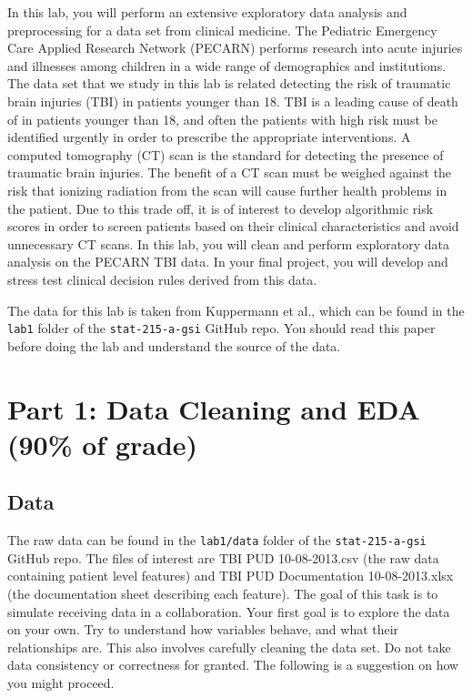 \documentclass[10pt,letterpaper]{article}
\begin{document}
In this lab, you will perform an extensive exploratory data analysis and preprocessing for a data set from clinical medicine. The Pediatric Emergency Care Applied Research Network (PECARN) performs research into acute injuries and illnesses among children in a wide range of demographics and institutions. The data set that we study in this lab is related detecting the risk of traumatic brain injuries (TBI) in patients younger than 18. TBI is a leading cause of death of in patients younger than 18, and often the patients with high risk must be identified urgently in order to prescribe the appropriate interventions. A computed tomography (CT) scan is the standard for detecting the presence of traumatic brain injuries. The benefit of a CT scan must be weighed against the risk that ionizing radiation from the scan will cause further health problems in the patient. Due to this trade off, it is of interest to develop algorithmic risk scores in order to screen patients based on their clinical characteristics and avoid unnecessary CT scans. In this lab, you will clean and perform exploratory data analysis on the PECARN TBI data. In your final project, you will develop and stress test clinical decision rules derived from this data.

The data for this lab is taken from Kuppermann et al., which can be found in the \texttt{lab1} folder of the \texttt{stat-215-a-gsi} GitHub repo. You should read this paper before doing the lab and understand the source of the data.

\section*{Part 1: Data Cleaning and EDA (90\% of grade)}
\subsection*{Data}

The raw data can be found in the \texttt{lab1/data} folder of the \texttt{stat-215-a-gsi} GitHub repo. The files of interest are TBI PUD 10-08-2013.csv (the raw data containing patient level features) and TBI PUD Documentation 10-08-2013.xlsx (the documentation sheet describing each feature). The goal of this task is to simulate receiving data in a collaboration. Your first goal is to explore the data on your own. Try to understand how variables behave, and what their relationships are. This also involves carefully cleaning the data set. Do not take data consistency or correctness for granted. The following is a suggestion on how you might proceed.
\end{document}
